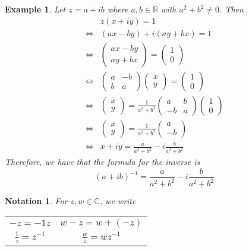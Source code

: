 \documentclass[11pt, oneside]{book}
\theoremstyle{break}
\newtheorem*{notation}{Notation}
\newtheorem{eg}{Example}[section]
\begin{document}
\begin{eg}
	Let $z = a + ib$ where $a, b \in \mathbb{R}$ with $a^2 + b^2 \neq 0$. Then
	\begin{align*}
				 & z(x + iy) = 1 \\
		\iff & (ax - by) + i(ay + bx) = 1 \\
		\iff & \begin{pmatrix} ax - by \\ ay + bx	\end{pmatrix} = \begin{pmatrix} 1 \\ 0 \end{pmatrix} \\
		\iff & \begin{pmatrix} a & -b \\ b & a \end{pmatrix}\begin{pmatrix} x \\ y \end{pmatrix} = \begin{pmatrix} 1 \\ 0 \end{pmatrix} \\
		\iff & \begin{pmatrix} x \\ y \end{pmatrix} = \frac{1}{a^2 + b^2} \begin{pmatrix} a & b \\ -b & a \end{pmatrix}	\begin{pmatrix} 1 \\ 0 \end{pmatrix} \\
		\iff & \begin{pmatrix} x \\ y \end{pmatrix} = \frac{1}{a^2 + b^2}\begin{pmatrix} a \\ -b \end{pmatrix} \\
		\iff & x + iy = \frac{a}{a^2 + b^2} - i \frac{b}{a^2 + b^2} 
	\end{align*}
	Therefore, we have that the formula for the inverse is
	\begin{equation}\label{eq:complex inverse}
		(a + ib)^{-1} = \frac{a}{a^2 +b^2} - i \frac{b}{a^2 + b^2} 
	\end{equation}
\end{eg}

\begin{notation}
	For $z, w \in \mathbb{C}$, we write
	\begin{center}
		\begin{tabular}{c c}
			$-z = -1z$ & $w - z = w + (-z)$ \\
			$\frac{1}{z} = z^{-1}$ & $\frac{w}{z} = wz^{-1}$
		\end{tabular}
	\end{center}
\end{notation}
\end{document}
